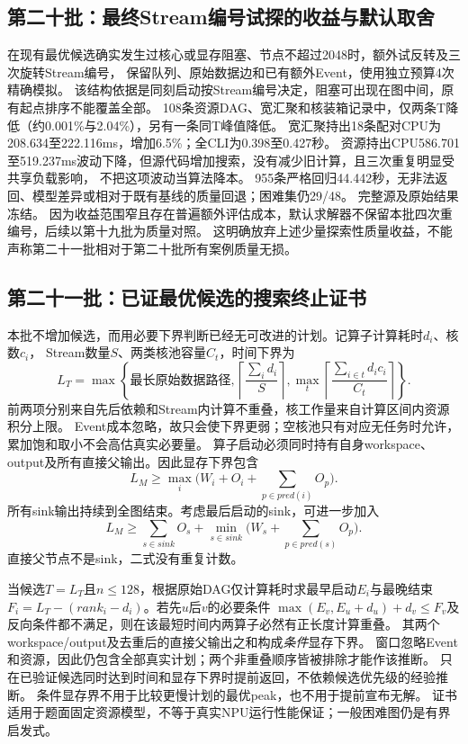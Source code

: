 \documentclass[UTF8,a4paper,11pt,fontset=fandol]{ctexart}
\begin{document}
\subsection{第二十批：最终Stream编号试探的收益与默认取舍}
在现有最优候选确实发生过核心或显存阻塞、节点不超过2048时，额外试反转及三次旋转Stream编号，
保留队列、原始数据边和已有额外Event，使用独立预算4次精确模拟。
该结构依据是同刻启动按Stream编号决定，阻塞可出现在图中间，原有起点排序不能覆盖全部。
108条资源DAG、宽汇聚和核装箱记录中，仅两条T降低（约0.001\%与2.04\%），另有一条同T峰值降低。
宽汇聚持出18条配对CPU为208.634至222.116ms，增加6.5\%；全CLI为0.398至0.427秒。
资源持出CPU586.701至519.237ms波动下降，但源代码增加搜索，没有减少旧计算，且三次重复明显受共享负载影响，
不把这项波动当算法降本。
955条严格回归44.442秒，无非法返回、模型差异或相对于既有基线的质量回退；困难集仍29/48。
完整源及原始结果冻结。
因为收益范围窄且存在普遍额外评估成本，默认求解器不保留本批四次重编号，后续以第十九批为质量对照。
这明确放弃上述少量探索性质量收益，不能声称第二十一批相对于第二十批所有案例质量无损。

\subsection{第二十一批：已证最优候选的搜索终止证书}
本批不增加候选，而用必要下界判断已经无可改进的计划。记算子计算耗时$d_i$、核数$c_i$，
Stream数量$S$、两类核池容量$C_t$，时间下界为
\[
L_T=\max\left\{\text{最长原始数据路径},\left\lceil\frac{\sum_i d_i}{S}\right\rceil,
\max_t\left\lceil\frac{\sum_{i\in t}d_i c_i}{C_t}\right\rceil\right\}.
\]
前两项分别来自先后依赖和Stream内计算不重叠，核工作量来自计算区间内资源积分上限。
Event成本忽略，故只会使下界更弱；空核池只有对应无任务时允许，累加饱和取小不会高估真实必要量。
算子启动必须同时持有自身workspace、output及所有直接父输出。因此显存下界包含
\[
L_M\ge\max_i\bigl(W_i+O_i+\sum_{p\in pred(i)}O_p\bigr).
\]
所有sink输出持续到全图结束。考虑最后启动的sink，可进一步加入
\[
L_M\ge \sum_{s\in sink}O_s+\min_{s\in sink}\bigl(W_s+\sum_{p\in pred(s)}O_p\bigr).
\]
直接父节点不是sink，二式没有重复计数。

当候选$T=L_T$且$n\le128$，根据原始DAG仅计算耗时求最早启动$E_i$与最晚结束
$F_i=L_T-(rank_i-d_i)$。若先$u$后$v$的必要条件
$\max(E_v,E_u+d_u)+d_v\le F_v$及反向条件都不满足，则在该最短时间内两算子必然有正长度计算重叠。
其两个workspace/output及去重后的直接父输出之和构成\emph{条件}显存下界。
窗口忽略Event和资源，因此仍包含全部真实计划；两个非重叠顺序皆被排除才能作该推断。
只在已验证候选同时达到时间和显存下界时提前返回，不依赖候选优先级的经验推断。
条件显存界不用于比较更慢计划的最优peak，也不用于提前宣布无解。
证书适用于题面固定资源模型，不等于真实NPU运行性能保证；一般困难图仍是有界启发式。
\end{document}

